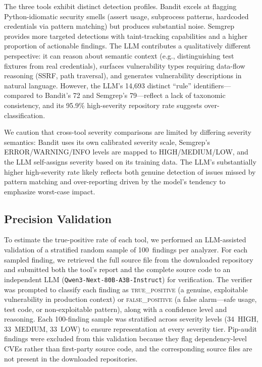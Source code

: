 \documentclass[sigconf,authordraft]{acmart}
\begin{document}
The three tools exhibit distinct detection profiles. Bandit excels at
flagging Python-idiomatic security smells (assert usage, subprocess
patterns, hardcoded credentials via pattern matching) but produces
substantial noise. Semgrep provides more targeted detections with
taint-tracking capabilities and a higher proportion of actionable
findings. The LLM contributes a qualitatively different perspective:
it can reason about semantic context (e.g., distinguishing test
fixtures from real credentials), surfaces vulnerability types
requiring data-flow reasoning (SSRF, path traversal), and generates
vulnerability descriptions in natural language. However, the LLM's
14{,}693 distinct ``rule'' identifiers---compared to Bandit's 72 and
Semgrep's 79---reflect a lack of taxonomic consistency, and its 95.9\%
high-severity repository rate suggests over-classification.

We caution that cross-tool severity comparisons are limited by
differing severity semantics: Bandit uses its own calibrated severity
scale, Semgrep's ERROR/WARNING/INFO levels are mapped to
HIGH/MEDIUM/LOW, and the LLM self-assigns severity based on its
training data. The LLM's substantially higher high-severity rate
likely reflects both genuine detection of issues missed by pattern
matching and over-reporting driven by the model's tendency to
emphasize worst-case impact.

\subsection{Precision Validation}

To estimate the true-positive rate of each tool, we performed an
LLM-assisted validation of a stratified random sample of 100~findings
per analyzer. For each sampled finding, we retrieved the full source
file from the downloaded repository and submitted both the tool's
report and the complete source code to an independent LLM
(\texttt{Qwen3-Next-80B-A3B-Instruct}) for verification. The verifier
was prompted to classify each finding as \textsc{true\_positive} (a
genuine, exploitable vulnerability in production context) or
\textsc{false\_positive} (a false alarm---safe usage, test code, or
non-exploitable pattern), along with a confidence level and reasoning.
Each 100-finding sample was stratified across severity levels (34~HIGH,
33~MEDIUM, 33~LOW) to ensure representation at every severity tier.
Pip-audit findings were excluded from this validation because they
flag dependency-level CVEs rather than first-party source code, and
the corresponding source files are not present in the downloaded
repositories.
\end{document}
